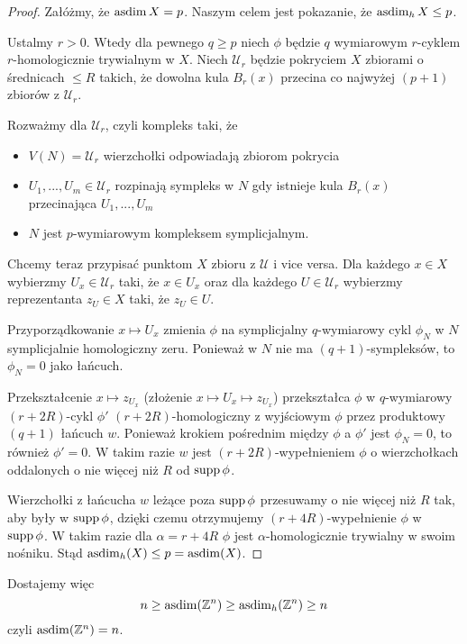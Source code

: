 \begin{proof}
  Załóżmy, że $\operatorname{asdim} X=p$. Naszym celem jest pokazanie, że $\operatorname{asdim}_h X\leq p$. 

  Ustalmy $r>0$. Wtedy dla pewnego $q\geq p$ niech $\phi$ będzie $q$ wymiarowym $r$-cyklem $r$-homologicznie trywialnym w $X$. Niech $\mathcal{U}_r$ będzie pokryciem $X$ zbiorami o średnicach $\leq R$ takich, że dowolna kula $B_r(x)$ przecina co najwyżej $(p+1)$ zbiorów z $\mathcal{U}_r$. 

  Rozważmy  dla $\mathcal{U}_r$, czyli kompleks taki, że
  \begin{itemize}
    \item $V(N)=\mathcal{U}_r$ wierzchołki odpowiadają zbiorom pokrycia
    \item $U_1,...,U_m\in \mathcal{U}_r$ rozpinają sympleks w $N$ gdy istnieje kula $B_r(x)$ przecinająca $U_1,..., U_m$
    \item $N$ jest $p$-wymiarowym kompleksem symplicjalnym.
  \end{itemize}

  Chcemy teraz przypisać punktom $X$ zbioru z $\mathcal{U}$ i vice versa. Dla każdego $x\in X$ wybierzmy $U_x\in \mathcal{U}_r$ taki, że $x\in U_x$ oraz dla każdego $U\in \mathcal{U}_r$ wybierzmy reprezentanta $z_U\in X$ taki, że $z_U\in U$.

  Przyporządkowanie $x\mapsto U_x$ zmienia $\phi$ na symplicjalny $q$-wymiarowy cykl $\phi_N$ w $N$ symplicjalnie homologiczny zeru. Ponieważ w $N$ nie ma $(q+1)$-sympleksów, to $\phi_N=0$ jako łańcuch.

  Przekształcenie $x\mapsto z_{U_x}$ (złożenie $x\mapsto U_x\mapsto z_{U_x}$) przekształca $\phi$ w $q$-wymiarowy $(r+2R)$-cykl $\phi'$ $(r+2R)$-homologiczny z wyjściowym $\phi$ przez produktowy $(q+1)$ łańcuch $w$. Ponieważ krokiem pośrednim między $\phi$ a $\phi'$ jest $\phi_N=0$, to również $\phi'=0$. W takim razie $w$ jest $(r+2R)$-wypełnieniem $\phi$ o wierzchołkach oddalonych o nie więcej niż $R$ od $\operatorname{supp}\phi$.

  Wierzchołki z łańcucha $w$ leżące poza $\operatorname{supp}\phi$ przesuwamy o nie więcej niż $R$ tak, aby były w $\operatorname{supp}\phi$, dzięki czemu otrzymujemy $(r+4R)$-wypełnienie $\phi$ w $\operatorname{supp}\phi$. W takim razie dla $\alpha=r+4R$ $\phi$ jest $\alpha$-homologicznie trywialny w swoim nośniku. Stąd $\operatorname{asdim}_h(X)\leq p=\operatorname{asdim}(X)$.
\end{proof}

Dostajemy więc 
$$n\geq \operatorname{asdim}(\mathbb{Z}^n)\geq \operatorname{asdim}_h(\mathbb{Z}^n)\geq n$$
czyli $\operatorname{asdim}(\mathbb{Z}^n)=n$.

